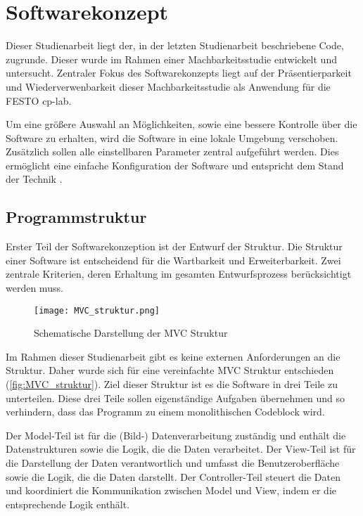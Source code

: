 \chapter{Softwarekonzept} \label{chap:Konzept}

Dieser Studienarbeit liegt der, in der letzten Studienarbeit beschriebene Code, zugrunde. Dieser wurde im Rahmen einer Machbarkeitsstudie entwickelt und untersucht.
Zentraler Fokus des Softwarekonzepts liegt auf der Präsentierparkeit und Wiederverwenbarkeit dieser Machbarkeitsstudie als Anwendung für die FESTO \ac{cp-lab}.

Um eine größere Auswahl an Möglichkeiten, sowie eine bessere Kontrolle über die Software zu erhalten, wird die Software in eine lokale Umgebung verschoben. Zusätzlich sollen alle einstellbaren Parameter zentral aufgeführt werden. Dies ermöglicht eine einfache Konfiguration der Software und entspricht dem Stand der Technik\cite{gur_diskussion_2024} \cite{oliveira_how_2023}. 

\section{Programmstruktur} \label{sec:architektur}

Erster Teil der Softwarekonzeption ist der Entwurf der Struktur. Die Struktur einer Software ist entscheidend für die Wartbarkeit und Erweiterbarkeit. Zwei zentrale Kriterien, deren Erhaltung im gesamten Entwurfsprozess berücksichtigt werden muss.

\begin{figure}[H]
    \centering
    \texttt{[image: MVC\_struktur.png]}
    \caption{Schematische Darstellung der MVC Struktur \cite{noauthor_model_2024}} 
    \label{fig:MVC_struktur}
\end{figure}

Im Rahmen dieser Studienarbeit gibt es keine externen Anforderungen an die Struktur. Daher wurde sich für eine vereinfachte \ac{MVC} Struktur entschieden (\autoref{fig:MVC_struktur}). Ziel dieser Struktur ist es die Software in drei Teile zu unterteilen.
Diese drei Teile sollen eigenständige Aufgaben übernehmen und so verhindern, dass das Programm zu einem monolithischen Codeblock wird.

Der Model-Teil ist für die (Bild-) Datenverarbeitung zuständig und enthält die Datenstrukturen sowie die Logik, die die Daten verarbeitet. Der View-Teil ist für die Darstellung der Daten verantwortlich und umfasst die Benutzeroberfläche sowie die Logik, die die Daten darstellt. Der Controller-Teil steuert die Daten und koordiniert die Kommunikation zwischen Model und View, indem er die entsprechende Logik enthält.


